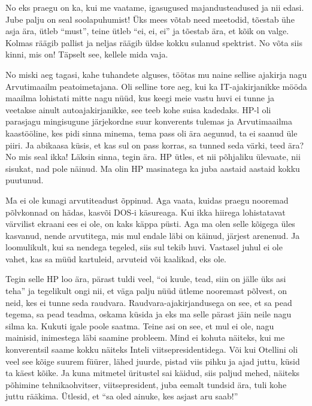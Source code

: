 
No eks  praegu on ka, kui me vaatame, igasugused majandusteadused ja nii edasi. Jube palju on seal soolapuhumist! Üks mees võtab need meetodid, tõestab ühe asja ära, ütleb \enquote{must}, teine ütleb \enquote{ei, ei, ei} ja tõestab ära, et kõik on valge. Kolmas räägib pallist ja neljas räägib üldse kokku sulanud spektrist. No võta siis kinni, mis on! Täpselt see, kellele mida vaja.
                 

No miski aeg tagasi, kahe tuhandete alguses, töötas mu naine sellise ajakirja nagu Arvutimaailm peatoimetajana. Oli selline tore aeg, kui ka IT-ajakirjanikke  mööda maailma lohistati mitte nagu nüüd, kus  keegi meie vastu huvi ei tunne ja veetakse ainult autoajakirjanikke, see teeb kohe suisa kadedaks. HP-l oli parasjagu mingisugune järjekordne suur konverents tulemas ja Arvutimaailma kaastööline, kes pidi sinna minema, tema pass oli ära aegunud, ta ei saanud üle piiri. Ja abikaasa küsis, et kas sul on pass korras, sa tunned seda värki, teed ära? No mis seal ikka! Läksin sinna, tegin ära. HP ütles, et nii põhjaliku ülevaate, nii sisukat, nad pole näinud. Ma olin HP masinatega ka juba aastaid aastaid kokku puutunud. 

Ma  ei ole kunagi arvutiteadust õppinud. Aga vaata, kuidas praegu nooremad põlvkonnad on hädas, kasvõi DOS-i käsureaga. Kui ikka hiirega lohistatavat värvilist ekraani ees ei ole, on kaks käppa püsti. Aga ma olen selle kõigega üles kasvanud, nende arvutitega, mis mul endale läbi on käinud, järjest arenenud. Ja loomulikult, kui sa nendega tegeled, siis sul tekib huvi. Vastasel juhul ei ole vahet, kas sa müüd kartuleid, arvuteid või kaalikad, eks ole. 

Tegin selle HP loo ära, pärast tuldi veel, \enquote{oi kuule, tead, siin on jälle üks asi teha} ja tegelikult ongi nii, et väga palju nüüd ütleme nooremast põlvest, on neid, kes ei tunne seda raudvara. Raudvara-ajakirjandusega on see, et sa pead tegema, sa pead teadma, oskama küsida ja eks ma selle pärast jäin neile nagu silma ka. Kukuti igale poole saatma. Teine asi on see, et mul ei ole, nagu mainisid, inimestega läbi saamine probleem. Mind ei  kohuta  näiteks, kui me konverentsil saame kokku näiteks Inteli viitsepresidentidega. Või kui Otellini  oli veel see kõige suurem füürer, lähed juurde, pistad viis pihku ja ajad  juttu, küsid ta käest kõike. Ja kuna mitmetel üritustel sai käidud, siis paljud mehed, näiteks põhimine tehnikaohvitser, viitsepresident, juba eemalt tundsid ära,  tuli kohe juttu rääkima. Ütlesid, et \enquote{sa oled ainuke, kes asjast aru saab!}

